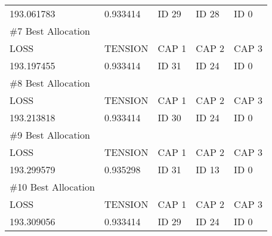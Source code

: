 \documentclass[12pt]{article}
\begin{document}
\begin{table}[]
\begin{tabular}{lllll}
			193.061783                             & 0.933414 & ID 29 & ID 28 & ID 0  \vspace{0.3cm} \\ 
			\#7 Best Allocation                    &          &       &       &       \\ \hline
			LOSS                                   & TENSION  & CAP 1 & CAP 2 & CAP 3 \\
			193.197455                             & 0.933414 & ID 31 & ID 24 & ID 0  \vspace{0.3cm} \\ 
			\#8 Best Allocation                    &          &       &       &       \\ \hline
			LOSS                                   & TENSION  & CAP 1 & CAP 2 & CAP 3 \\
			193.213818                             & 0.933414 & ID 30 & ID 24 & ID 0  \vspace{0.3cm} \\ 
			\#9 Best Allocation                    &          &       &       &       \\ \hline
			LOSS                                   & TENSION  & CAP 1 & CAP 2 & CAP 3 \\
			193.299579                             & 0.935298 & ID 31 & ID 13 & ID 0  \vspace{0.3cm} \\ 
			\#10 Best Allocation                   &          &       &       &       \\ \hline
			LOSS                                   & TENSION  & CAP 1 & CAP 2 & CAP 3 \\
			193.309056                             & 0.933414 & ID 29 & ID 24 & ID 0 
		\end{tabular}
	\end{table}
	
\end{document}

